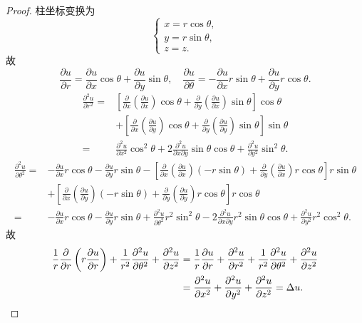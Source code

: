 \begin{proof}
  柱坐标变换为
  \[\begin{cases}
    x = r\cos\theta, \\
    y = r\sin\theta, \\
    z = z.
  \end{cases}\]
  故
  \[\frac{\partial u}{\partial r}
    = \frac{\partial u}{\partial x}\cos\theta
      + \frac{\partial u}{\partial y}\sin\theta,\quad
    \frac{\partial u}{\partial\theta}
    = -\frac{\partial u}{\partial x}r\sin\theta
      + \frac{\partial u}{\partial y}r\cos\theta.\]
  \[\begin{split}
  \frac{\partial^2u}{\partial r^2}
    ={} & \left[\frac{\partial}{\partial x}\left(\frac{\partial u}{\partial x}\right)\cos\theta
          + \frac{\partial}{\partial y}\left(\frac{\partial u}{\partial x}\right)\sin\theta\right]\cos\theta \\
        & + \left[\frac{\partial}{\partial x}\left(\frac{\partial u}{\partial y}\right)\cos\theta
          + \frac{\partial}{\partial y}\left(\frac{\partial u}{\partial y}\right)\sin\theta\right]\sin\theta \\
    ={} & \frac{\partial^2u}{\partial x^2}\cos^2\theta
          + 2\frac{\partial^2u}{\partial x\partial y}\sin\theta\cos\theta
          + \frac{\partial^2u}{\partial y^2}\sin^2\theta.
  \end{split}\]
  \[\begin{split}
  \frac{\partial^2u}{\partial\theta^2}=
    & -\frac{\partial u}{\partial x}r\cos\theta-\frac{\partial u}{\partial y}r\sin\theta
      - \left[\frac{\partial}{\partial x}\left(\frac{\partial u}{\partial x}\right)(-r\sin\theta)
      + \frac{\partial}{\partial y}\left(\frac{\partial u}{\partial x}\right)r\cos\theta\right]r\sin\theta \\
    & + \left[\frac{\partial}{\partial x}\left(\frac{\partial u}{\partial y}\right)(-r\sin\theta)
      + \frac{\partial}{\partial y}\left(\frac{\partial u}{\partial y}\right)r\cos\theta\right]r\cos\theta \\
    ={} & -\frac{\partial u}{\partial x}r\cos\theta-\frac{\partial u}{\partial y}r\sin\theta
      + \frac{\partial^2u}{\partial\theta^2}r^2\sin^2\theta-2\frac{\partial^2u}{\partial x\partial y}r^2\sin\theta\cos\theta+\frac{\partial^2u}{\partial y^2}r^2\cos^2\theta.
  \end{split}\]
  故
  \begin{align*}
    \frac{1}{r}\frac{\partial}{\partial r}\left(r\frac{\partial u}{\partial r}\right)
      + \frac{1}{r^2}\frac{\partial^2u}{\partial\theta^2}
      + \frac{\partial^2u}{\partial z^2}
    & = \frac{1}{r}\frac{\partial u}{\partial r}+\frac{\partial^2u}{\partial r^2}
      + \frac{1}{r^2}\frac{\partial^2u}{\partial\theta^2} + \frac{\partial^2u}{\partial z^2} \\
    & = \frac{\partial^2u}{\partial x^2}+\frac{\partial^2u}{\partial y^2}
      + \frac{\partial^2u}{\partial z^2}=\Delta u. \qedhere
  \end{align*}
\end{proof}



